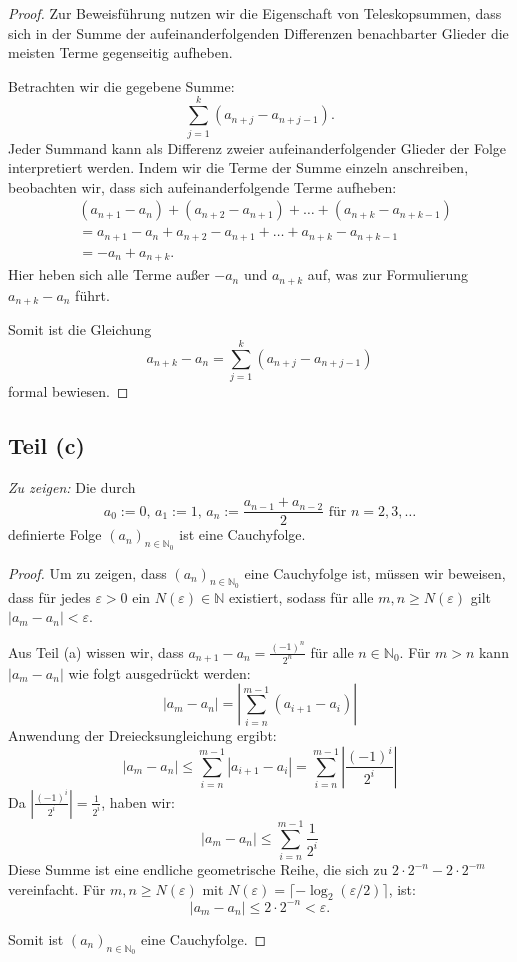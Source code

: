 \documentclass{article}
\theoremstyle{definition}
\theoremstyle{remark}
\begin{document}
\begin{proof}
Zur Beweisführung nutzen wir die Eigenschaft von Teleskopsummen, dass sich in der Summe der aufeinanderfolgenden Differenzen benachbarter Glieder die meisten Terme gegenseitig aufheben.

Betrachten wir die gegebene Summe:
\[ \sum_{j=1}^{k} (a_{n+j} - a_{n+j-1}). \]
Jeder Summand kann als Differenz zweier aufeinanderfolgender Glieder der Folge interpretiert werden. Indem wir die Terme der Summe einzeln anschreiben, beobachten wir, dass sich aufeinanderfolgende Terme aufheben:
\begin{align*}
&(a_{n+1} - a_n) + (a_{n+2} - a_{n+1}) + \ldots + (a_{n+k} - a_{n+k-1}) \\
&= a_{n+1} - a_n + a_{n+2} - a_{n+1} + \ldots + a_{n+k} - a_{n+k-1} \\
&= - a_n + a_{n+k}.
\end{align*}
Hier heben sich alle Terme außer \( -a_n \) und \( a_{n+k} \) auf, was zur Formulierung \( a_{n+k} - a_n \) führt.

Somit ist die Gleichung
\[ a_{n+k} - a_n = \sum_{j=1}^{k} (a_{n+j} - a_{n+j-1}) \]
formal bewiesen.
\end{proof}

\subsection*{Teil (c)}
\textit{Zu zeigen:} Die durch
\[ a_0 := 0, \, a_1 := 1, \, a_n := \frac{a_{n-1} + a_{n-2}}{2} \text{ für } n = 2, 3, \dots \]
definierte Folge \( (a_n)_{n \in \mathbb{N}_0} \) ist eine Cauchyfolge.

\begin{proof}
Um zu zeigen, dass \( (a_n)_{n \in \mathbb{N}_0} \) eine Cauchyfolge ist, müssen wir beweisen, dass für jedes \( \varepsilon > 0 \) ein \( N(\varepsilon) \in \mathbb{N} \) existiert, sodass für alle \( m, n \geq N(\varepsilon) \) gilt \( |a_m - a_n| < \varepsilon \).

Aus Teil (a) wissen wir, dass \( a_{n+1} - a_n = \frac{(-1)^n}{2^n} \) für alle \( n \in \mathbb{N}_0 \). Für \( m > n \) kann \( |a_m - a_n| \) wie folgt ausgedrückt werden:
\[ |a_m - a_n| = \left| \sum_{i=n}^{m-1} (a_{i+1} - a_i) \right| \]
Anwendung der Dreiecksungleichung ergibt:
\[ |a_m - a_n| \leq \sum_{i=n}^{m-1} |a_{i+1} - a_i| = \sum_{i=n}^{m-1} \left| \frac{(-1)^i}{2^i} \right| \]
Da \( \left| \frac{(-1)^i}{2^i} \right| = \frac{1}{2^i} \), haben wir:
\[ |a_m - a_n| \leq \sum_{i=n}^{m-1} \frac{1}{2^i} \]
Diese Summe ist eine endliche geometrische Reihe, die sich zu \( 2 \cdot 2^{-n} - 2 \cdot 2^{-m} \) vereinfacht. Für \( m, n \geq N(\varepsilon) \) mit \( N(\varepsilon) = \lceil -\log_2(\varepsilon/2) \rceil \), ist:
\[ |a_m - a_n| \leq 2 \cdot 2^{-n} < \varepsilon. \]

Somit ist \( (a_n)_{n \in \mathbb{N}_0} \) eine Cauchyfolge.
\end{proof}
\end{document}
